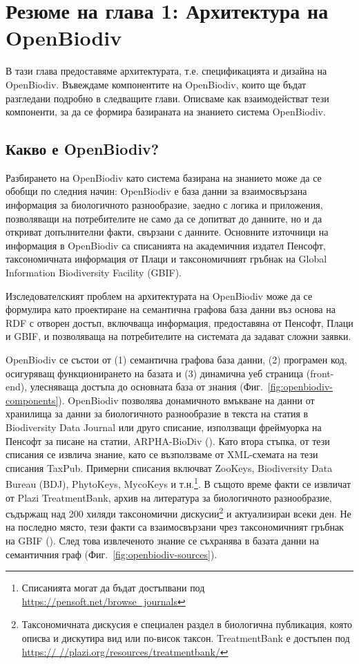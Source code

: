 \chapter{Резюме на глава 1: Архитектура на OpenBiodiv}
\label{chapter-openbiodiv}

В тази глава предоставяме архитектурата, т.е. спецификацията и дизайна на OpenBiodiv. Въвеждаме компонентите на OpenBiodiv, които ще бъдат разгледани подробно в следващите глави. Описваме как взаимодействат тези компоненти, за да се формира базираната на знанието система OpenBiodiv.

\section{Какво е OpenBiodiv?}

Разбирането на OpenBiodiv като система базирана на знанието може да се обобщи по следния начин: OpenBiodiv е база данни за взаимосвързана информация за биологичното разнообразие, заедно с логика и приложения, позволяващи на потребителите не само да се допитват до данните, но и да откриват допълнителни факти, свързани с данните. Основните източници на информация в OpenBiodiv са списанията на академичния издател Пенсофт, таксономичната информация от Плаци и таксономичният гръбнак на Global Information Biodiversity Facility (GBIF).

Изследователският проблем на архитектурата на OpenBiodiv може да се формулира като проектиране на семантична графова база данни въз основа на RDF с отворен достъп, включваща информация, предоставяна от Пенсофт, Плаци и GBIF, и позволяваща на потребителите на системата да задават сложни заявки.

OpenBiodiv се състои от (1) семантична графова база данни, (2) програмен код, осигуряващ функционирането на базата и (3) динамична уеб страница (front-end), улесняваща достъпа до основната база от знания (Фиг.~\ref{fig:openbiodiv-components}). OpenBiodiv позволява донамичното вмъкване на данни от хранилища за данни за биологичното разнообразие в текста на статия в Biodiversity Data Journal или друго списание, използващи фреймуорка на Пенсофт за писане на статии, ARPHA-BioDiv (\cite{penev_arpha-biodiv:_2017}). Като втора стъпка, от тези списания се извлича знание, като се възползваме от XML-схемата на тези списания TaxPub. Примерни списания включват ZooKeys, Biodiversity Data Bureau (BDJ), PhytoKeys, MycoKeys и т.н.\footnote{Списанията могат да бъдат достъпвани под \url{https://pensoft.net/browse_journals}}. В същото време факти се извличат от Plazi TreatmentBank, архив на литература за биологичното разнообразие, съдържащ над 200 хиляди таксономични дискусии\footnote{Таксономичната дискусия е специален раздел в биологична публикация, която описва и дискутира вид или по-висок таксон. TreatmentBank е достъпен под \url{https:// //plazi.org/resources/treatmentbank/}} и актуализиран всеки ден. Не на последно място, тези факти са взаимосвързани чрез таксономичният гръбнак на GBIF (\cite{gbif_secretariat_gbif_2017}). След това извлеченото знание се съхранява в базата данни на семантичния граф (Фиг.~\ref{fig:openbiodiv-sources}).

